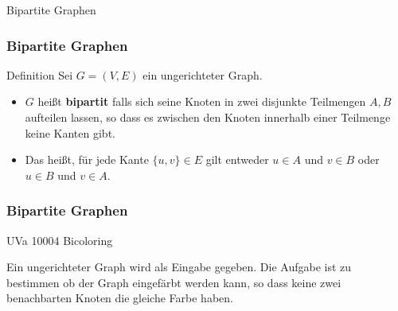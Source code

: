 \begin{frame}
	\Huge Bipartite Graphen
\end{frame}

\begin{frame}
	\frametitle{Bipartite Graphen}
	\begin{KITinfoblock}{Definition}
		Sei $G = (V,E)$ ein ungerichteter Graph.
	\begin{itemize}
		\item  $G$ heißt \textbf{bipartit} falls sich seine Knoten in zwei disjunkte Teilmengen $A, B$ aufteilen lassen, so dass es zwischen den Knoten innerhalb einer Teilmenge keine Kanten gibt.
		\item  Das heißt, für jede Kante $\{u,v\} \in E$ gilt entweder $u \in A$ und $v \in B$ oder $u \in B$ und $v \in A$.
	\end{itemize}
	\end{KITinfoblock}
\end{frame}

\begin{frame}
	\frametitle{Bipartite Graphen}
	\begin{KITexampleblock}{UVa 10004 Bicoloring}
		
		  	
		Ein ungerichteter Graph wird als Eingabe gegeben. Die Aufgabe ist zu bestimmen ob der Graph eingefärbt werden kann, so dass keine zwei benachbarten Knoten die gleiche Farbe haben.
		 
		  
	\end{KITexampleblock}
\end{frame}



